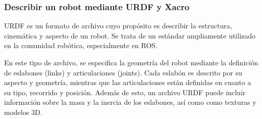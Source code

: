 \subsubsection{Describir un robot mediante URDF y Xacro}
\ac{URDF} es un formato de archivo cuyo propósito es describir la estructura, cinemática y aspecto de un robot.  
Se trata de un estándar ampliamente utilizado en la comunidad robótica, especialmente en \ac{ROS}.

En este tipo de archivo, se especifica la geometría del robot mediante la definición de eslabones (links) 
y articulaciones (joints). 
Cada eslabón es descrito por su aspecto y geometría, mientras que las articulaciones están definidas
en cuanto a su tipo, recorrido y posición. Además de esto, un archivo URDF puede incluir información 
sobre la masa y la inercia de los eslabones, así como como texturas y modelos 3D.

